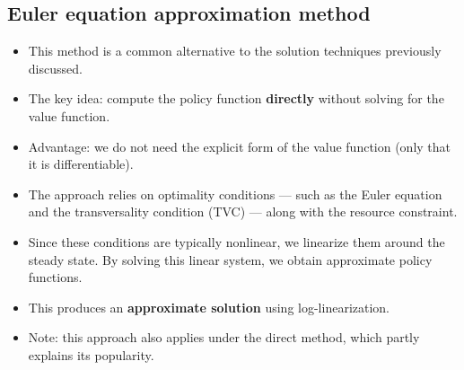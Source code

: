 \documentclass[12pt]{article}
\begin{document}
\subsection*{\noindent\textbf{Euler equation approximation method}}

\begin{itemize}
    \item This method is a common alternative to the solution techniques previously discussed.

    \item The key idea: compute the policy function \textbf{directly} without solving for the value function.

    \item Advantage: we do not need the explicit form of the value function (only that it is differentiable).

    \item The approach relies on optimality conditions — such as the Euler equation and the transversality condition (TVC) — along with the resource constraint.

    \item Since these conditions are typically nonlinear, we linearize them around the steady state.  
    By solving this linear system, we obtain approximate policy functions.

    \item This produces an \textbf{approximate solution} using log-linearization.

    \item Note: this approach also applies under the direct method, which partly explains its popularity.
\end{itemize}

\bigskip
\end{document}
